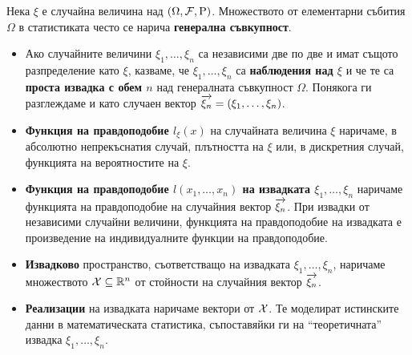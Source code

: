 \documentclass[numbers=endperiod, bibliography=totocnumbered]{scrartcl}
\begin{document}
\begin{definition}[Извадки]
  Нека \( \xi \) е случайна величина над \( (\Omega, \mathcal{F}, \operatorname{P}) \). Множеството от елементарни събития \( \Omega \) в статистиката често се нарича \textbf{генерална съвкупност}.

  \begin{itemize}
    \item Ако случайните величини \( \xi_1, \ldots, \xi_n \) са независими две по две и имат същото разпределение като \( \xi \), казваме, че \( \xi_1, \ldots, \xi_n \) са \textbf{наблюдения над \( \xi \)} и че те са \textbf{проста извадка с обем \( n \)} над генералната съвкупност \( \Omega \). Понякога ги разглеждаме и като случаен вектор \( \overrightarrow{\xi_n} = (\xi_1, \ldots, \xi_n) \).
    \item \textbf{Функция на правдоподобие \( l_\xi(x) \)} на случайната величина \( \xi \) наричаме, в абсолютно непрекъснатия случай, плътността на \( \xi \) или, в дискретния случай, функцията на вероятностите на \( \xi \).
    \item \textbf{Функция на правдоподобие \( l(x_1, \ldots, x_n) \) на извадката \( \xi_1, \ldots, \xi_n \)} наричаме функцията на правдоподобие на случайния вектор \( \overrightarrow{\xi_n} \). При извадки от независими случайни величини, функцията на правдоподобие на извадката е произведение на индивидуалните функции на правдоподобие.
    \item \textbf{Извадково} пространство, съответстващо на извадката \( \xi_1, \ldots, \xi_n \), наричаме множеството \( \mathcal{X} \subseteq \mathbb{R}^n \) от стойности на случайния вектор \( \overrightarrow{\xi_n} \).
    \item \textbf{Реализации} на извадката наричаме вектори от \( \mathcal{X} \). Те моделират истинските данни в математическата статистика, съпоставяйки ги на \enquote{теоретичната} извадка \( \xi_1, \ldots, \xi_n \).
  \end{itemize}
\end{definition}
\end{document}
